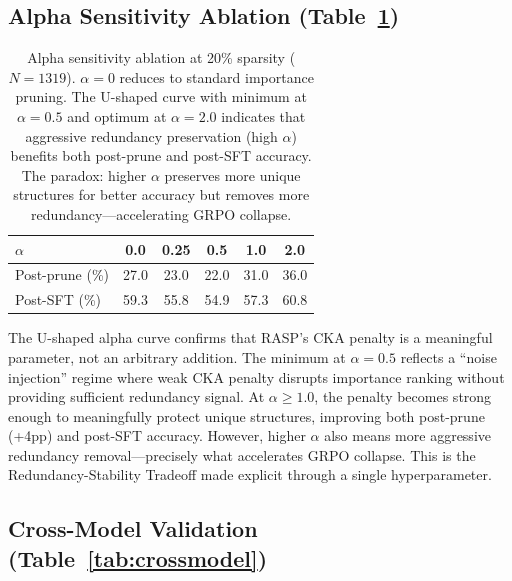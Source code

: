 \documentclass[11pt,a4paper]{article}
\begin{document}
\subsection{Alpha Sensitivity Ablation (Table~\ref{tab:alpha})}

\begin{table}[t]
\centering
\small
\begin{tabular}{lccccc}
\toprule
$\alpha$ & 0.0 & 0.25 & 0.5 & 1.0 & 2.0 \\
\midrule
Post-prune (\%) & 27.0 & 23.0 & 22.0 & 31.0 & 36.0 \\
Post-SFT (\%) & 59.3 & 55.8 & 54.9 & 57.3 & 60.8 \\
\bottomrule
\end{tabular}
\caption{Alpha sensitivity ablation at 20\% sparsity ($N=1319$). $\alpha=0$ reduces to standard importance pruning. The U-shaped curve with minimum at $\alpha=0.5$ and optimum at $\alpha=2.0$ indicates that aggressive redundancy preservation (high $\alpha$) benefits both post-prune and post-SFT accuracy. The paradox: higher $\alpha$ preserves more unique structures for better accuracy but removes more redundancy---accelerating GRPO collapse.}
\label{tab:alpha}
\end{table}

The U-shaped alpha curve confirms that RASP's CKA penalty is a meaningful parameter, not an arbitrary addition. The minimum at $\alpha=0.5$ reflects a ``noise injection'' regime where weak CKA penalty disrupts importance ranking without providing sufficient redundancy signal. At $\alpha \geq 1.0$, the penalty becomes strong enough to meaningfully protect unique structures, improving both post-prune (+4pp) and post-SFT accuracy. However, higher $\alpha$ also means more aggressive redundancy removal---precisely what accelerates GRPO collapse. This is the Redundancy-Stability Tradeoff made explicit through a single hyperparameter.

\subsection{Cross-Model Validation (Table~\ref{tab:crossmodel})}
\end{document}

